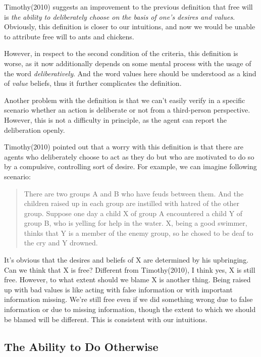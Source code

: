 Timothy(2010) suggests an improvement to the previous definition that free will is \emph{the ability to deliberately choose on the basis of one’s desires and values}. Obviously, this definition is closer to our intuitions, and now we would be unable to attribute free will to ants and chickens.

However, in respect to the second condition of the criteria, this definition is worse, as it now additionally depends on some mental process with the usage of the word \emph{deliberatively}. And the word values here should be understood as a kind of \emph{value} beliefs, thus it further complicates the definition.

Another problem with the definition is that we can’t easily verify in a specific scenario whether an action is deliberate or not from a third-person perspective. However, this is not a difficulty in principle, as the agent can report the deliberation openly.

Timothy(2010) pointed out that a worry with this definition is that there are agents who deliberately choose to act as they do but who are motivated to do so by a compulsive, controlling sort of desire. For example, we can imagine following scenario:

\begin{quote}
There are two groups A and B who have feuds between them. And the children raised up in each group are instilled with hatred of the other group. Suppose one day a child X of group A encountered a child Y of group B, who is yelling for help in the water. X, being a good swimmer, thinks that Y is a member of the enemy group, so he chosed to be deaf to the cry and Y drowned.
\end{quote}

It’s obvious that the desires and beliefs of X are determined by his upbringing. Can we think that X is free? Different from Timothy(2010), I think yes, X is still free. However, to what extent should we blame X is another thing. Being raised up with bad values is like acting with false information or with important information missing. We’re still free even if we did something wrong due to false information or due to missing information, though the extent to which we should be blamed will be different. This is consistent with our intuitions.

\subsection{The Ability to Do Otherwise}

